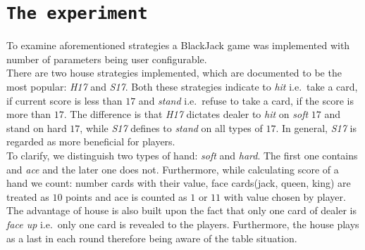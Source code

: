 \documentclass[12pt,a4paper,twocolumn]{article}
\begin{document}
\section*{\texttt{The experiment}}
To examine aforementioned strategies a BlackJack game was implemented with number of parameters being user configurable.\\
There are two house strategies implemented, which are documented to be the most popular: \emph{H17} and \emph{S17}. Both these strategies indicate to \emph{hit} i.e.\ take a card, if current score is less than $17$ and \emph{stand} i.e.\ refuse to take a card, if the score is more than $17$. The difference is that \emph{H17} dictates dealer to \emph{hit} on \emph{soft} $17$ and stand on hard $17$, while \emph{S17} defines to \emph{stand} on all types of $17$. In general, \emph{S17} is regarded as more beneficial for players.\\
To clarify, we distinguish two types of hand: \emph{soft} and \emph{hard}. The first one contains and \emph{ace} and the later one does not. Furthermore, while calculating score of a hand we count: number cards with their value, face cards(jack, queen, king) are treated as $10$ points and ace is counted as $1$ or $11$ with value chosen by player.\\

The advantage of house is also built upon the fact that only one card of dealer is \emph{face up} i.e.\ only one card is revealed to the players. Furthermore, the house plays as a last in each round therefore being aware of the table situation.\\
\end{document}
